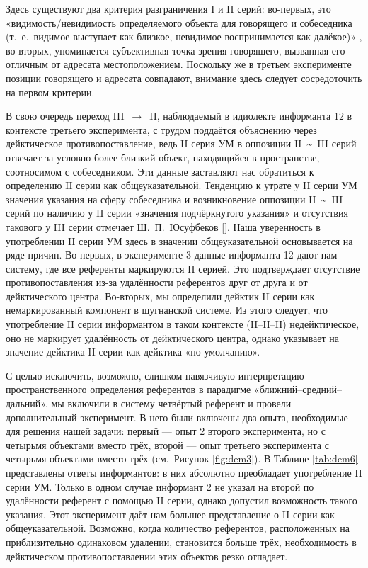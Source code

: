 Здесь существуют два критерия разграничения I и II серий: во-первых, это «видимость/невидимость определяемого объекта для говорящего и собеседника (т.~е.~видимое выступает как близкое, невидимое воспринимается как далёкое)» \parencite[39]{yusufbekov1998}, во-вторых, упоминается субъективная точка зрения говорящего, вызванная его отличным от адресата местоположением. Поскольку же в третьем эксперименте позиции говорящего и адресата совпадают, внимание здесь следует сосредоточить на первом критерии.

В свою очередь переход III~$\rightarrow$~II, наблюдаемый в идиолекте информанта 12 в контексте третьего эксперимента, с трудом поддаётся объяснению через дейктическое противопоставление, ведь II серия УМ в оппозиции II~\textasciitilde~III серий отвечает за условно более близкий объект, находящийся в пространстве, соотносимом с собеседником. Эти данные заставляют нас обратиться к определению II серии как общеуказательной. Тенденцию к утрате у II серии УМ значения указания на сферу собеседника и возникновение оппозиции II~\textasciitilde~III серий по наличию у II серии «значения подчёркнутого указания» и отсутствия такового у III серии отмечает Ш.~П.~Юсуфбеков [\cite*[41]{yusufbekov1998}]. Наша уверенность в употреблении II серии УМ здесь в значении общеуказательной основывается на ряде причин. Во-первых, в эксперименте 3 данные информанта 12 дают нам систему, где все референты маркируются II серией. Это подтверждает отсутствие противопоставления из-за удалённости референтов друг от друга и от дейктического центра. Во-вторых, мы определили дейктик II серии как немаркированный компонент в шугнанской системе. Из этого следует, что употребление II серии информантом в таком контексте (II–II–II) недейктическое, оно не маркирует удалённость от дейктического центра, однако указывает на значение дейктика II серии как дейктика «по умолчанию».

\pagebreak[2]

С целью исключить, возможно, слишком навязчивую интерпретацию пространственного определения референтов в парадигме «ближний–средний–дальний», мы включили в систему четвёртый референт и провели дополнительный эксперимент. В него были включены два опыта, необходимые для решения нашей задачи: первый — опыт 2 второго эксперимента, но с четырьмя объектами вместо трёх, второй — опыт третьего эксперимента с четырьмя объектами вместо трёх (см.~Рисунок \ref{fig:dem3}). В Таблице \ref{tab:dem6} представлены ответы информантов: в них абсолютно преобладает употребление II серии УМ. Только в одном случае информант 2 не указал на второй по удалённости референт с помощью II серии, однако допустил возможность такого указания. Этот эксперимент даёт нам большее представление о II серии как общеуказательной. Возможно, когда количество референтов, расположенных на приблизительно одинаковом удалении, становится больше трёх, необходимость в дейктическом противопоставлении этих объектов резко отпадает.

